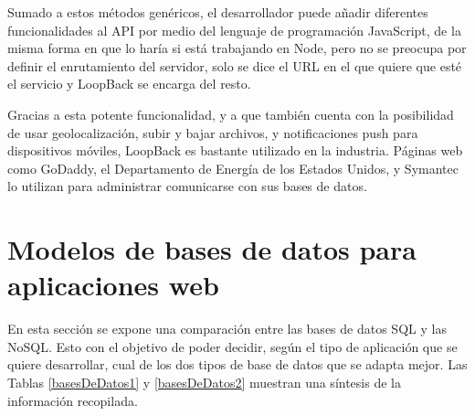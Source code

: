 Sumado a estos métodos genéricos, el desarrollador puede añadir diferentes funcionalidades al API por medio del lenguaje de programación JavaScript, de la misma forma en que lo haría si está trabajando en Node, pero no se preocupa por definir el enrutamiento del servidor, solo se dice el URL en el que quiere que esté el servicio y LoopBack se encarga del resto.

Gracias a esta potente funcionalidad, y a que también cuenta con la posibilidad de usar geolocalización, subir y bajar archivos, y notificaciones push para dispositivos móviles, LoopBack es bastante utilizado en la industria. Páginas web como GoDaddy, el Departamento de Energía de los Estados Unidos, y Symantec lo utilizan para administrar comunicarse con sus bases de datos.

\section{Modelos de bases de datos para aplicaciones web}

En esta sección se expone una comparación entre las bases de datos SQL y las NoSQL. Esto con el objetivo de poder decidir, según el tipo de aplicación que se quiere desarrollar, cual de los dos tipos de base de datos que se adapta mejor. Las Tablas \ref{basesDeDatos1} y \ref{basesDeDatos2} muestran una síntesis de la información recopilada.

